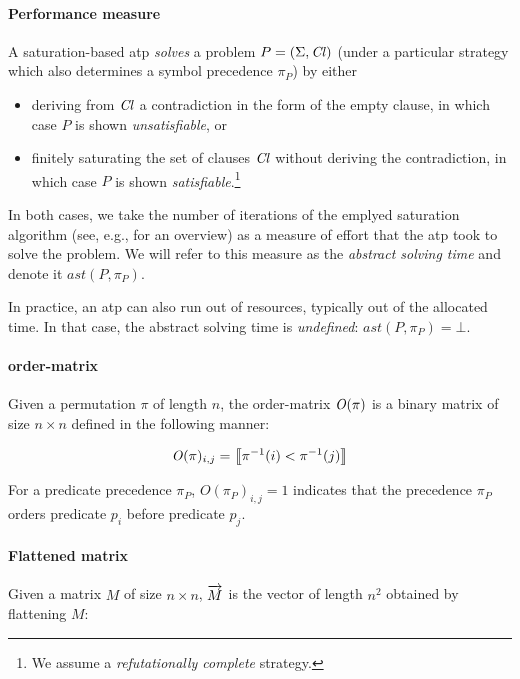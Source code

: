 \paragraph{Performance measure} A saturation-based \gls{atp} \emph{solves} a problem \(P = (\Sigma,\operatorname{\mathit{Cl}})\)
(under a particular strategy which also determines a symbol precedence \(\pi_P\))  by either
\begin{itemize}
\item
	deriving from \(\operatorname{\mathit{Cl}}\) a contradiction in the form of the empty clause,
	in which case \(P\) is shown \emph{unsatisfiable}, or
\item
	finitely saturating the set of clauses \(\operatorname{\mathit{Cl}}\) without deriving the contradiction,
	in which case \(P\) is shown \emph{satisfiable}.\footnote{We assume a \emph{refutationally complete} strategy.}	
\end{itemize}
In both cases, we take the number of iterations of the emplyed saturation algorithm (see, e.g., \cite{DBLP:journals/jsc/RiazanovV03} for an overview) as a measure of effort that the \gls{atp} took to solve the problem.
We will refer to this measure as the \emph{abstract solving time} and denote it \(\mathit{ast}(P,\pi_P)\).

In practice, an \gls{atp} can also run out of resources, typically out of the allocated time.
In that case, the abstract solving time is \emph{undefined}: \(\mathit{ast}(P,\pi_P) = \bot\).



\newpage

\paragraph{\Gls{order-matrix}}
Given a permutation \(\pi\) of length \(n\),
the \gls{order-matrix} \(\operatorname{\mathit{O}}(\pi)\) is a binary matrix of size \(n \times n\)
defined in the following manner:

\begin{align*}
\operatorname{\mathit{O}}(\pi)_{i, j} = \left \llbracket \pi^{-1}(i) < \pi^{-1}(j) \right \rrbracket
\end{align*}

For a predicate precedence \(\pi_P\), \(O(\pi_P)_{i, j} = 1\) indicates that
the precedence \(\pi_P\) orders predicate \(p_i\) before predicate \(p_j\).

\paragraph{Flattened matrix}
Given a matrix \(M\) of size \(n \times n\),
\(\overrightarrow{M}\) is the vector of length \(n^2\) obtained by flattening \(M\):

